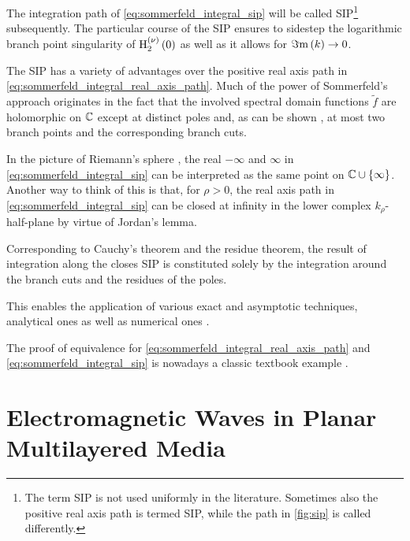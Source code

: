The integration path of \eqref{eq:sommerfeld_integral_sip} will be called
\acf{SIP}\footnote{
	The term \acl{SIP} is not used uniformly in the literature.
	Sometimes also the positive real axis path is termed \ac{SIP}, while the
	path in \cref{fig:sip} is called differently.
	}
subsequently.
The particular course of the \ac{SIP} ensures to sidestep the logarithmic
branch point singularity of $\operatorname{H}_{2}^{\left( \nu \right)}\left(0\right)$ \cite{Olver2010}
as well as it allows for $\Im\mathrm{m}\left(k\right) \to 0$.

The \ac{SIP} has a variety of advantages over the positive real axis path in
\eqref{eq:sommerfeld_integral_real_axis_path}.
Much of the power of Sommerfeld's approach originates in the fact that the
involved spectral domain functions $\tilde{f}$ are holomorphic on $\mathbb{C}$ except at 
distinct poles and, as can be shown \cite{Michalski2016b}, at most two
branch points and the corresponding branch cuts.

In the picture of Riemann's sphere \cite[180]{Meyberg2006}, the real
$-\infty$ and $\infty$ in \eqref{eq:sommerfeld_integral_sip} can be interpreted
as the same point on $\mathbb{C} \cup \left\{\infty\right\}$.
Another way to think of this is that, for $\rho > 0$, the real axis path in
\eqref{eq:sommerfeld_integral_sip} can be closed at infinity in the lower
complex $k_\rho$-half-plane by virtue of Jordan's lemma.

Corresponding to Cauchy's theorem and the residue theorem, the result of
integration along the closes \ac{SIP} is constituted solely by the integration
around the branch cuts and the residues of the poles.

This enables the application of various exact and asymptotic techniques,
analytical ones as well as numerical ones
\cite{Sommerfeld1964,Chew1999,Michalski1985a,Michalski2016b}.

The proof of equivalence for \eqref{eq:sommerfeld_integral_real_axis_path} and
\eqref{eq:sommerfeld_integral_sip} is nowadays a classic textbook example
\cite[203]{Sommerfeld1964}.













\section{Electromagnetic Waves in Planar Multilayered Media}

